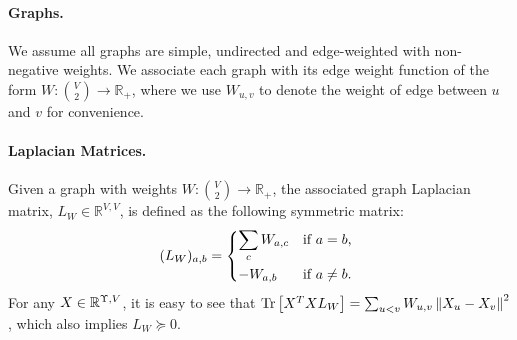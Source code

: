 \documentclass{article}
\newcommand{\R}{\mathbb{R}}
\DeclareMathOperator{\tr}{Tr}
\def\ngap{}
\begin{document}
\paragraph{Graphs.} We assume all graphs are simple, undirected and
edge-weighted with non-negative weights. We associate each graph with
its edge weight function of the form $W:\binom{V}{2} \to \R_+$, where
we use $W_{u,v}$ to denote the weight of edge between $u$ and $v$ for
convenience.

\smallskip
\paragraph{Laplacian Matrices.} Given a graph with weights
$W:\binom{V}{2} \to\R_+$, the associated graph Laplacian matrix, $L_W
\in \R^{V,V}$, is defined as the following symmetric matrix:
\[
(L_W)_{a,b} = \begin{dcases*}
		\sum_{c} W_{a,c} & if $a=b$, \\
		- W_{a,b} & if $a\neq b$.
	\end{dcases*}
\] 
For any $\xmat \in \R^{\Upsilon, V}$, it is easy to see that
$\tr\left[ \xmat^T \xmat L_W\right] = \sum_{u<v} W_{u,v} \left\|
  \xmat_u-\xmat_v \right\|^2$, which also implies $L_W \succeq 0$.
\ngap
\end{document}

